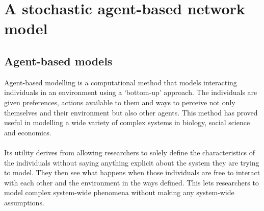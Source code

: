 \chapter{A stochastic agent-based network model}
\label{ch:abms}
\section{Agent-based models}
Agent-based modelling is a computational method that models interacting individuals in an environment using a `bottom-up' approach\cite{abm-gilbert}. The individuals are given preferences, actions available to them and ways to perceive not only themselves and their environment but also other agents. This method has proved useful in modelling a wide variety of complex systems in biology\cite{kroese-uppal}, social science\cite{epstein} and economics\cite{abm-economics}.\\
\\
Its utility derives from allowing researchers to solely define the characteristics of the individuals without saying anything explicit about the system they are trying to model. They then see what happens when those individuals are free to interact with each other and the environment in the ways defined. This lets researchers to model complex system-wide phenomena without making any system-wide assumptions.
